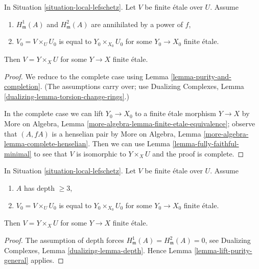 \begin{lemma}
\label{lemma-lift-purity-general}
In Situation \ref{situation-local-lefschetz}.
Let $V$ be finite \'etale over $U$. Assume
\begin{enumerate}
\item $H^1_\mathfrak m(A)$ and $H^2_\mathfrak m(A)$
are annihilated by a power of $f$,
\item $V_0 = V \times_U U_0$ is equal to $Y_0 \times_{X_0} U_0$
for some $Y_0 \to X_0$ finite \'etale.
\end{enumerate}
Then $V = Y \times_X U$ for some $Y \to X$ finite \'etale.
\end{lemma}

\begin{proof}
We reduce to the complete case using Lemma \ref{lemma-purity-and-completion}.
(The assumptions carry over; use Dualizing Complexes, Lemma
\ref{dualizing-lemma-torsion-change-rings}.)

\medskip\noindent
In the complete case we can lift $Y_0 \to X_0$ to a finite \'etale
morphism $Y \to X$ by
More on Algebra, Lemma \ref{more-algebra-lemma-finite-etale-equivalence};
observe that $(A, fA)$ is a henselian pair by
More on Algebra, Lemma \ref{more-algebra-lemma-complete-henselian}.
Then we can use Lemma \ref{lemma-fully-faithful-minimal}
to see that $V$ is isomorphic to $Y \times_X U$ and
the proof is complete.
\end{proof}

\begin{lemma}
\label{lemma-lift-purity}
In Situation \ref{situation-local-lefschetz}.
Let $V$ be finite \'etale over $U$. Assume
\begin{enumerate}
\item $A$ has depth $\geq 3$,
\item $V_0 = V \times_U U_0$ is equal to $Y_0 \times_{X_0} U_0$
for some $Y_0 \to X_0$ finite \'etale.
\end{enumerate}
Then $V = Y \times_X U$ for some $Y \to X$ finite \'etale.
\end{lemma}

\begin{proof}
The assumption of depth forces
$H^1_\mathfrak m(A) = H^2_\mathfrak m(A) = 0$, see
Dualizing Complexes, Lemma \ref{dualizing-lemma-depth}.
Hence Lemma \ref{lemma-lift-purity-general} applies.
\end{proof}










